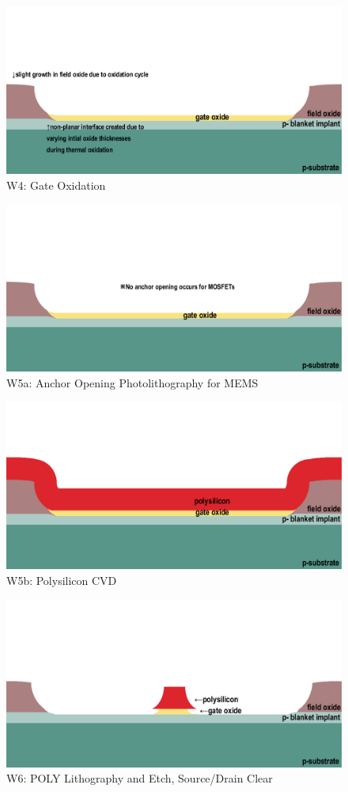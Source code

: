 \documentclass{article}
\begin{document}
\begin{figure}[H]
\centering
\includegraphics[width=350pt]{CrossSections_Updates/MOSFETw4.png}
\caption{W4: Gate Oxidation}
\end{figure}
\begin{figure}[H]
\centering
\includegraphics[width=350pt]{CrossSections/MOSFETlabprofiles/MOSFETw5anote.png}
\caption{W5a: Anchor Opening Photolithography for MEMS}
\end{figure}
\begin{figure}[H]
\centering
\includegraphics[width=350pt]{CrossSections/MOSFETlabprofiles/MOSFETw5b.png}
\caption{W5b: Polysilicon CVD}
\end{figure}
\begin{figure}[H]
\centering
\includegraphics[width=350pt]{CrossSections/MOSFETlabprofiles/MOSFETw6.png}
\caption{W6: POLY Lithography and Etch, Source/Drain Clear}
\end{figure}
\end{document}
